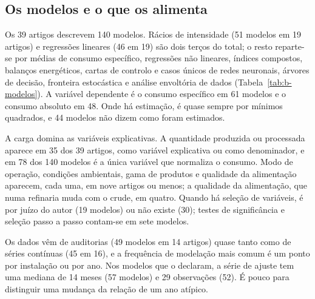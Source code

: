 \subsection{Os modelos e o que os alimenta}

Os 39 artigos descrevem 140 modelos. Rácios de intensidade (51 modelos em
19 artigos) e regressões lineares (46 em 19) são dois terços do total; o
resto reparte-se por médias de consumo específico, regressões não lineares,
índices compostos, balanços energéticos, cartas de controlo e casos únicos
de redes neuronais, árvores de decisão, fronteira estocástica e análise
envoltória de dados (Tabela~\ref{tab:b-modelos}). A variável dependente é o
consumo específico em 61 modelos e o consumo absoluto em 48. Onde há
estimação, é quase sempre por mínimos quadrados, e 44 modelos não dizem como
foram estimados.

A carga domina as variáveis explicativas. A quantidade produzida ou
processada aparece em 35 dos 39 artigos, como variável explicativa ou como
denominador, e em 78 dos 140 modelos é a única variável que normaliza o
consumo. Modo de operação, condições ambientais, gama de produtos e
qualidade da alimentação aparecem, cada uma, em nove artigos ou menos; a
qualidade da alimentação, que numa refinaria muda com o crude, em quatro.
Quando há seleção de variáveis, é por juízo do autor (19 modelos) ou não
existe (30); testes de significância e seleção passo a passo contam-se em
sete modelos.

Os dados vêm de auditorias (49 modelos em 14 artigos) quase tanto como de
séries contínuas (45 em 16), e a frequência de modelação mais comum é um
ponto por instalação ou por ano. Nos modelos que o declaram, a série de
ajuste tem uma mediana de 14 meses (57 modelos) e 29 observações (52).
É pouco para distinguir uma mudança da relação de um ano atípico.

